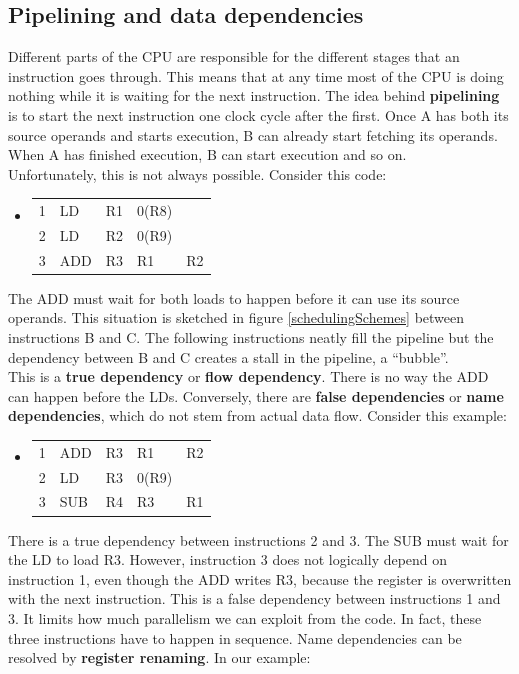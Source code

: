 \documentclass[12pt,a4paper]{article}
\newenvironment {assembly}{\begingroup \ttfamily \color{Orange} \begin{itemize} \item[]}{\end{itemize}\endgroup}
\begin{document}
\subsection{Pipelining and data dependencies}
Different parts of the CPU are responsible for the different stages that an instruction goes through. This means that at any time most of the CPU is doing nothing while it is waiting for the next instruction. The idea behind \textbf{pipelining} is to start the next instruction one clock cycle after the first. Once A has both its source operands and starts execution, B can already start fetching its operands. When A has finished execution, B can start execution and so on. \\
Unfortunately, this is not always possible. Consider this code: 
\begin{assembly}
	\begin{tabularx} {\textwidth} {l l a a X}
		1 & LD 	& R1 & 0(R8)	& \\
		2 & LD 	& R2 & 0(R9)	& \\
		3 & ADD & R3 & R1		& R2 \\
	\end{tabularx}
\end{assembly}
The ADD must wait for both loads to happen before it can use its source operands. This situation is sketched in figure \ref{schedulingSchemes} between instructions B and C. The following instructions neatly fill the pipeline but the dependency between B and C creates a stall in the pipeline, a ``bubble''.\\
This is a \textbf{true dependency} or \textbf{flow dependency}. There is no way the ADD can happen before the LDs. Conversely, there are \textbf{false dependencies} or \textbf{name dependencies}, which do not stem from actual data flow. Consider this example:
\begin{assembly}
	\begin{tabularx} {\textwidth} {l l a a X}
		1 & ADD & R3 & R1		& R2 \\
		2 & LD  & R3 & 0(R9)	& \\
		3 & SUB & R4 & R3		& R1\\
	\end{tabularx}
\end{assembly}
There is a true dependency between instructions 2 and 3. The SUB must wait for the LD to load R3. However, instruction 3 does not logically depend on instruction 1, even though the ADD writes R3, because the register is overwritten with the next instruction. This is a false dependency between instructions 1 and 3. It limits how much parallelism we can exploit from the code. In fact, these three instructions have to happen in sequence. Name dependencies can be resolved by \textbf{register renaming}. In our example:
\end{document}
